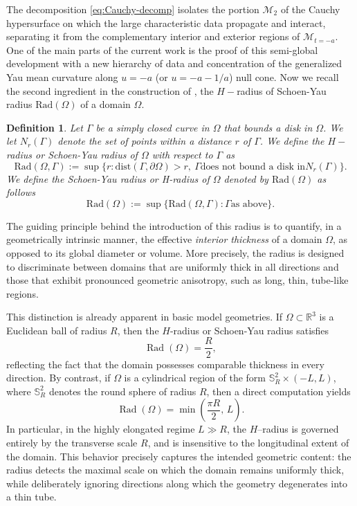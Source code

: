 \documentclass{amsart}
\newtheorem{definition}{Definition}
\begin{document}
\noindent The decomposition \eqref{eq:Cauchy-decomp} isolates the portion $\mathcal{M}_{2}$ of the Cauchy hypersurface 
on which the large characteristic data propagate and interact, 
separating it from the complementary interior and exterior regions of $\mathcal{M}_{t=-a}$. One of the main parts of the current work is the proof of this semi-global development with a new hierarchy of data and concentration of the generalized Yau mean curvature along $u=-a$ (or $u=-a-1/a$) null cone. Now we recall the second ingredient in the construction of \cite{yau}, the $H-$radius of Schoen-Yau radius $\text{Rad}(\Omega)$ of a domain $\Omega$. 
\begin{definition}
\label{Hradius}
Let $\Gamma$ be a simply closed curve in $\Omega$ that bounds a disk in $\Omega$. We let $N_{r}(\Gamma)$ denote the set of points within a distance $r$ of $\Gamma$. We define the $H-$radius or Schoen-Yau radius of $\Omega$ with respect to $\Gamma$ as 
    \[
    \text{Rad}(\Omega,\Gamma):=\sup \{r: \text{dist}(\Gamma,\partial\Omega)>r,~\Gamma \text{does not bound a disk in} N_{r}(\Gamma)\}.
    \]
    We define the Schoen-Yau radius or H-radius of $\Omega$ denoted by $\text{Rad}(\Omega)$ as follows 
    \[
    \text{Rad}(\Omega):=\sup\{\text{Rad}(\Omega,\Gamma):\Gamma \text{as above}\}.
    \]
\end{definition}
\noindent The guiding principle behind the introduction of this radius is to quantify, in a geometrically intrinsic manner, the effective \emph{interior thickness} of a domain $\Omega$, as opposed to its global diameter or volume. More precisely, the radius is designed to discriminate between domains that are uniformly thick in all directions and those that exhibit pronounced geometric anisotropy, such as long, thin, tube-like regions.

\noindent This distinction is already apparent in basic model geometries. If $\Omega \subset \mathbb{R}^{3}$ is a Euclidean ball of radius $R$, then the $H$-radius or  Schoen-Yau radius satisfies
\[
\operatorname{Rad}(\Omega)=\frac{R}{2},
\]
reflecting the fact that the domain possesses comparable thickness in every direction. By contrast, if $\Omega$ is a cylindrical region of the form $\mathbb{S}^{2}_{R}\times(-L,L)$, where $\mathbb{S}^{2}_{R}$ denotes the round sphere of radius $R$, then a direct computation yields
\[
\operatorname{Rad}(\Omega)=\min\!\left(\frac{\pi R}{2},\,L\right).
\]
In particular, in the highly elongated regime $L\gg R$, the $H$--radius is governed entirely by the transverse scale $R$, and is insensitive to the longitudinal extent of the domain. This behavior precisely captures the intended geometric content: the radius detects the maximal scale on which the domain remains uniformly thick, while deliberately ignoring directions along which the geometry degenerates into a thin tube.
\end{document}
